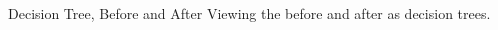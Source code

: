 \begin{frame}{Decision Tree, Before and After}
  Viewing the  before and after as decision trees.

  \begin{columns}
    \begin{column}{0.5\textwidth}
      \usebox\typecaseITEbox
    \end{column}
    \begin{column}{0.5\textwidth}  %
      \usebox\typecaseITEafterbox
    \end{column}
  \end{columns}
\end{frame}



